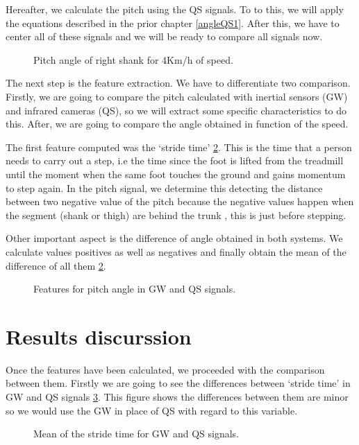 Hereafter, we calculate the pitch using the QS signals. To to this, we will apply the equations described in the prior chapter \ref{angleQS1}.
After this, we have to center all of these signals and we will be ready to compare all signals now.

\begin{figure}[H]
	\centering
	\caption{Pitch angle of right shank for 4Km/h of speed.}
	\label{fig:signalGWQS}
\end{figure}

The next step is the feature extraction. We have to differentiate two comparison. Firstly, we are going to compare the pitch calculated with inertial sensors (GW) and infrared cameras (QS), so we will extract some specific characteristics to do this. After, we are going to compare the angle obtained in function of the speed.

The first feature computed was the ‘stride time’ \ref{fig:featuresGWQS}. This is the time that a person needs to carry out a step, i.e the time since the foot is lifted from the treadmill until the moment when the same foot touches the ground and gains momentum to step again. In the pitch signal, we determine this detecting the distance between two negative value of the pitch because the negative values happen when the segment (shank or thigh) are behind the trunk , this is just before stepping.

Other important aspect is the difference of angle obtained in both systems. We calculate values positives as well as negatives and finally obtain the mean of the difference of all them \ref{fig:featuresGWQS}.
\begin{figure}[H]
	\centering
	\caption{Features for pitch angle in GW and QS signals.}
	\label{fig:featuresGWQS}
\end{figure}

\section{Results discurssion}
Once the features have been calculated, we proceeded with the comparison between them. Firstly we are going to see the differences between ‘stride time’ in GW and QS signals \ref{fig:mean_stride_time}. This figure shows the differences between them are minor so we would use the GW in place of QS with regard to this variable.

\begin{figure}[H]
	\centering
	\caption{Mean of the stride time for GW and QS signals.}
	\label{fig:mean_stride_time}
\end{figure}


